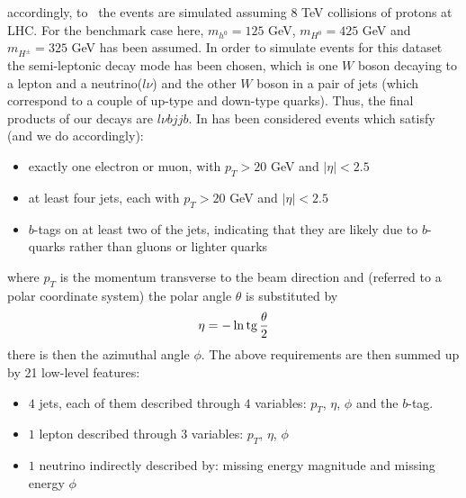 accordingly, to~\cite{paper} the events are simulated assuming $8$ TeV
collisions of protons at LHC. For the benchmark case here, $m_{h^0}=125$
GeV, $m_{H^0}=425$ GeV and $m_{H^\pm}=325$ GeV has been assumed.
In order to simulate events for this dataset the semi-leptonic decay mode has
been chosen, which is one $W$ boson decaying to a lepton and a
neutrino($l\nu$) and the other $W$ boson in a pair of jets (which
correspond to a couple of up-type and down-type quarks). Thus, the
final products of our decays are $l\nu b j j  b$.
In \cite{paper} has been considered events which satisfy (and we do
accordingly):
\begin{itemize}
 \item exactly one electron or muon, with $p_T > 20$ GeV and
       $\vert \eta \lvert < 2.5$
 \item at least four jets, each with $p_T > 20$ GeV and
       $\vert \eta \lvert < 2.5$
 \item $b$-tags on at least two of the jets, indicating that they are
       likely due to $b$-quarks rather than gluons or lighter quarks
\end{itemize}

where $p_T$ is the momentum transverse to the beam direction and
(referred to a polar coordinate system) the polar angle $\theta$
is substituted by
\[
 \eta = -\ln{\operatorname{tg}{\frac{\theta}{2}}}
\]
there is then the azimuthal angle $\phi$.
The above requirements are then summed up by 21 low-level features:
\begin{itemize}
 \item $4$ jets, each of them described through $4$ variables: $p_T$,
       $\eta$, $\phi$ and the $b$-tag.
 \item $1$ lepton described through 3 variables: $p_T$, $\eta$, $\phi$
 \item $1$ neutrino indirectly described by: missing energy magnitude and
       missing energy $\phi$
\end{itemize}

